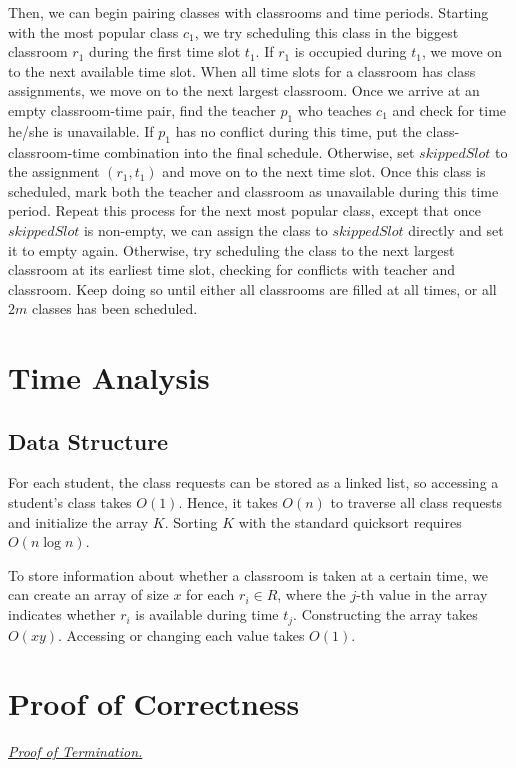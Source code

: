 \documentclass[11pt, oneside]{article}   	%
\begin{document}
Then, we can begin pairing classes with classrooms and time periods. Starting with the most popular class $c_1$, we try scheduling this class in the biggest classroom $r_1$ during the first time slot $t_1$. If $r_1$ is occupied during $t_1$, we move on to the next available time slot. When all time slots for a classroom has class assignments, we move on to the next largest classroom. Once we arrive at an empty classroom-time pair, find the teacher $p_1$ who teaches $c_1$ and check for time he/she is unavailable. If $p_1$ has no conflict during this time, put the class-classroom-time combination into the final schedule. Otherwise, set $skippedSlot$ to the assignment $(r_1, t_1)$ and move on to the next time slot. Once this class is scheduled, mark both the teacher and classroom as unavailable during this time period. Repeat this process for the next most popular class, except that once $skippedSlot$ is non-empty, we can assign the class to $skippedSlot$ directly and set it to empty again. Otherwise, try scheduling the class to the next largest classroom at its earliest time slot, checking for conflicts with teacher and classroom. Keep doing so until either all classrooms are filled at all times, or all $2m$ classes has been scheduled.\\


\section{Time Analysis}
\subsection{Data Structure}
For each student, the class requests can be stored as a linked list, so accessing a student's class takes $O(1)$. Hence, it takes $O(n)$ to traverse all class requests and initialize the array $K$. Sorting $K$ with the standard quicksort requires $O(n\log n)$.\par
To store information about whether a classroom is taken at a certain time, we can create an array of size $x$ for each $r_i\in R$, where the $j$-th value in the array indicates whether $r_i$ is available during time $t_j$. Constructing the array takes $O(xy)$. Accessing or changing each value takes $O(1)$.\par


\section{Proof of Correctness}
\underline{\textit{Proof of Termination.}}
\end{document}
